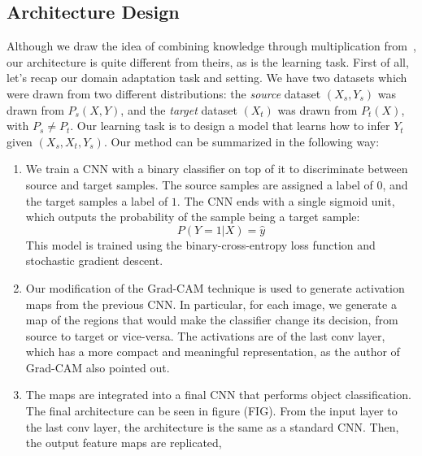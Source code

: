 \documentclass[../main.tex]{subfiles}
\begin{document}
    \subsection{Architecture Design}
    Although we draw the idea of combining knowledge through multiplication from~\cite{multfusion}, our architecture is quite different from
    theirs, as is the learning task. First of all, let's recap our domain adaptation task and setting. We have two datasets which were drawn
    from two different distributions: the \textit{source} dataset $(X_{s}, Y_{s})$ was drawn from $P_{s}(X, Y)$, and the \textit{target}
    dataset $(X_{t})$ was drawn from $P_{t}(X)$, with $P_{s} \neq P_{t}$. Our learning task is to design a model that learns how to infer
    $Y_{t}$ given $(X_{s}, X_{t}, Y_{s})$. Our method can be summarized in the following way:
    \begin{enumerate}
        \item We train a CNN with a binary classifier on top of it to discriminate between source and target samples. The source samples are
            assigned a label of $0$, and the target samples a label of $1$. The CNN ends with a single sigmoid unit, which outputs the
            probability of the sample being a target sample:
            $$ P(Y = 1 | X) = \hat{y} $$
            This model is trained using the binary-cross-entropy loss function and stochastic gradient descent.
        \item Our modification of the Grad-CAM technique is used to generate activation maps from the previous CNN\@. In particular,
            for each image, we generate a map of the regions that would make the classifier change its decision, from source to target or
            vice-versa. The activations are of the last conv layer, which has a more compact and meaningful representation, as the author
            of Grad-CAM also pointed out.
        \item The maps are integrated into a final CNN that performs object classification. The final architecture can be seen in figure
            (FIG). From the input layer to the last conv layer, the architecture is the same as a standard CNN\@. Then, the output
            feature maps are replicated, 
    \end{enumerate}
\end{document}
